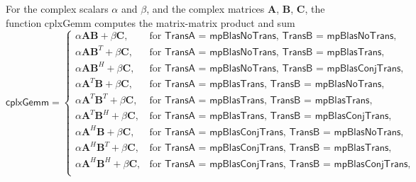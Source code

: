 \vspace{0.3cm}
For the complex scalars $\alpha$ and $\beta$, and the complex matrices $\boldsymbol{A}$, $\boldsymbol{B}$, $\boldsymbol{C}$, the function \textsf{cplxGemm} computes the matrix-matrix product and sum 
\begin{equation}
\textsf{cplxGemm}=\begin{cases}
\alpha \boldsymbol{A} \boldsymbol{B} + \beta \boldsymbol{C}, & \text{for } \textsf{TransA = mpBlasNoTrans, TransB = mpBlasNoTrans},\\
\alpha \boldsymbol{A} \boldsymbol{B}^T + \beta \boldsymbol{C}, & \text{for } \textsf{TransA = mpBlasNoTrans, TransB = mpBlasTrans},\\		
\alpha \boldsymbol{A} \boldsymbol{B}^H + \beta \boldsymbol{C}, & \text{for } \textsf{TransA = mpBlasNoTrans, TransB = mpBlasConjTrans},\\
\alpha \boldsymbol{A}^T \boldsymbol{B} + \beta \boldsymbol{C}, & \text{for } \textsf{TransA = mpBlasTrans, TransB = mpBlasNoTrans},\\
\alpha \boldsymbol{A}^T \boldsymbol{B}^T + \beta \boldsymbol{C}, & \text{for } \textsf{TransA = mpBlasTrans, TransB = mpBlasTrans},\\
\alpha \boldsymbol{A}^T \boldsymbol{B}^H + \beta \boldsymbol{C}, & \text{for } \textsf{TransA = mpBlasTrans, TransB = mpBlasConjTrans},\\
\alpha \boldsymbol{A}^H \boldsymbol{B} + \beta \boldsymbol{C}, & \text{for } \textsf{TransA = mpBlasConjTrans, TransB = mpBlasNoTrans},\\
\alpha \boldsymbol{A}^H \boldsymbol{B}^T + \beta \boldsymbol{C}, & \text{for } \textsf{TransA = mpBlasConjTrans, TransB = mpBlasTrans},\\
\alpha \boldsymbol{A}^H \boldsymbol{B}^H + \beta \boldsymbol{C}, & \text{for } \textsf{TransA = mpBlasConjTrans, TransB = mpBlasConjTrans},\\
\end{cases}
\end{equation}




%





